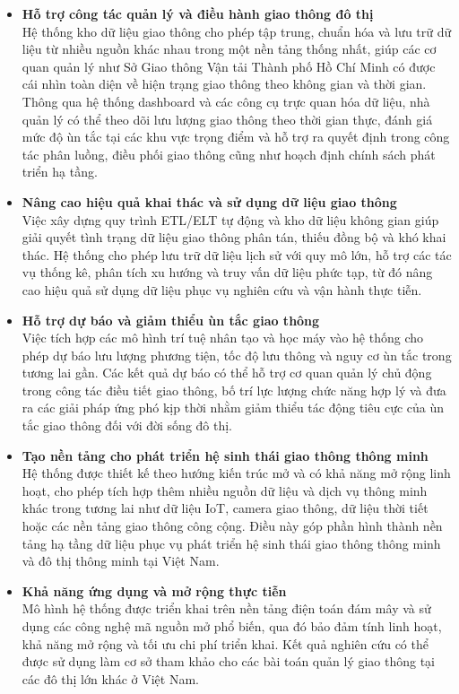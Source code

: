 \begin{itemize}

    \item \textbf{Hỗ trợ công tác quản lý và điều hành giao thông đô thị}\\
    Hệ thống kho dữ liệu giao thông cho phép tập trung, chuẩn hóa và lưu trữ dữ liệu từ nhiều nguồn khác nhau trong một nền tảng thống nhất, giúp các cơ quan quản lý như Sở Giao thông Vận tải Thành phố Hồ Chí Minh có được cái nhìn toàn diện về hiện trạng giao thông theo không gian và thời gian. Thông qua hệ thống dashboard và các công cụ trực quan hóa dữ liệu, nhà quản lý có thể theo dõi lưu lượng giao thông theo thời gian thực, đánh giá mức độ ùn tắc tại các khu vực trọng điểm và hỗ trợ ra quyết định trong công tác phân luồng, điều phối giao thông cũng như hoạch định chính sách phát triển hạ tầng.

    \item \textbf{Nâng cao hiệu quả khai thác và sử dụng dữ liệu giao thông}\\
    Việc xây dựng quy trình ETL/ELT tự động và kho dữ liệu không gian giúp giải quyết tình trạng dữ liệu giao thông phân tán, thiếu đồng bộ và khó khai thác. Hệ thống cho phép lưu trữ dữ liệu lịch sử với quy mô lớn, hỗ trợ các tác vụ thống kê, phân tích xu hướng và truy vấn dữ liệu phức tạp, từ đó nâng cao hiệu quả sử dụng dữ liệu phục vụ nghiên cứu và vận hành thực tiễn.

    \item \textbf{Hỗ trợ dự báo và giảm thiểu ùn tắc giao thông}\\
    Việc tích hợp các mô hình trí tuệ nhân tạo và học máy vào hệ thống cho phép dự báo lưu lượng phương tiện, tốc độ lưu thông và nguy cơ ùn tắc trong tương lai gần. Các kết quả dự báo có thể hỗ trợ cơ quan quản lý chủ động trong công tác điều tiết giao thông, bố trí lực lượng chức năng hợp lý và đưa ra các giải pháp ứng phó kịp thời nhằm giảm thiểu tác động tiêu cực của ùn tắc giao thông đối với đời sống đô thị.

    \item \textbf{Tạo nền tảng cho phát triển hệ sinh thái giao thông thông minh}\\
    Hệ thống được thiết kế theo hướng kiến trúc mở và có khả năng mở rộng linh hoạt, cho phép tích hợp thêm nhiều nguồn dữ liệu và dịch vụ thông minh khác trong tương lai như dữ liệu IoT, camera giao thông, dữ liệu thời tiết hoặc các nền tảng giao thông công cộng. Điều này góp phần hình thành nền tảng hạ tầng dữ liệu phục vụ phát triển hệ sinh thái giao thông thông minh và đô thị thông minh tại Việt Nam.

    \item \textbf{Khả năng ứng dụng và mở rộng thực tiễn}\\
    Mô hình hệ thống được triển khai trên nền tảng điện toán đám mây và sử dụng các công nghệ mã nguồn mở phổ biến, qua đó bảo đảm tính linh hoạt, khả năng mở rộng và tối ưu chi phí triển khai. Kết quả nghiên cứu có thể được sử dụng làm cơ sở tham khảo cho các bài toán quản lý giao thông tại các đô thị lớn khác ở Việt Nam.

\end{itemize}


